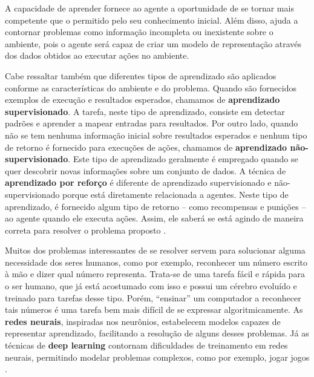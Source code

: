 A capacidade de aprender fornece ao agente a oportunidade de se tornar mais
competente que o permitido pelo seu conhecimento inicial.  Além disso, ajuda a
contornar problemas como informação incompleta ou inexistente sobre o ambiente,
pois o agente será capaz de criar um modelo de representação através dos dados
obtidos ao executar ações no ambiente.

Cabe ressaltar também que diferentes tipos de aprendizado são aplicados
conforme as características do ambiente e do problema. Quando são fornecidos
exemplos de execução e resultados esperados, chamamos de \textbf{aprendizado
supervisionado}. A tarefa, neste tipo de aprendizado, consiste em detectar
padrões e aprender a mapear entradas para resultados. Por outro lado, quando
não se tem nenhuma informação inicial sobre resultados esperados e nenhum tipo
de retorno é fornecido para execuções de ações, chamamos de \textbf{aprendizado
não-supervisionado}. Este tipo de aprendizado geralmente é empregado quando se
quer descobrir novas informações sobre um conjunto de dados. A técnica de
\textbf{aprendizado por reforço} é diferente de aprendizado supervisionado e
não-supervisionado porque está diretamente relacionada a agentes. Neste tipo de
aprendizado, é fornecido algum tipo de retorno -- como recompensas e punições
-- ao agente quando ele executa ações.  Assim, ele saberá se está agindo de
maneira correta para resolver o problema proposto
\cite[cap. 18]{RussellNorvig200912}.

Muitos dos problemas interessantes de se resolver servem para solucionar alguma
necessidade dos seres humanos, como por exemplo, reconhecer um número escrito à
mão e dizer qual número representa. Trata-se de uma tarefa fácil e rápida para
o ser humano, que já está acostumado com isso e possui um cérebro evoluído e
treinado para tarefas desse tipo. Porém, ``ensinar'' um computador a
reconhecer tais números é uma tarefa bem mais difícil de se expressar
algoritmicamente. As \textbf{redes neurais}, inspiradas nos neurônios,
estabelecem modelos capazes de representar aprendizado, facilitando a resolução
de alguns desses problemas. Já as técnicas de \textbf{deep learning}
\cite{DBLP:journals/corr/Schmidhuber14} contornam dificuldades de treinamento
em redes neurais, permitindo modelar problemas complexos, como por exemplo,
jogar jogos \cite{mnih-atari-2013}.
